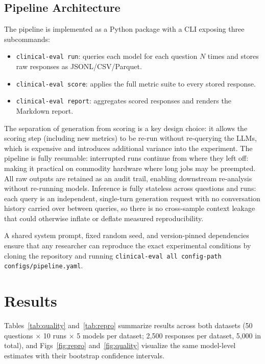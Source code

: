 \documentclass[11pt]{article}
\begin{document}
\subsection{Pipeline Architecture}

The pipeline is implemented as a Python package with a CLI exposing
three subcommands:

\begin{itemize}
  \item \texttt{clinical-eval run}: queries each model for each
        question $N$ times and stores raw responses as
        JSONL/CSV/Parquet.
  \item \texttt{clinical-eval score}: applies the full metric
        suite to every stored response.
  \item \texttt{clinical-eval report}: aggregates scored
        responses and renders the Markdown report.
\end{itemize}

The separation of generation from scoring is a key design choice:
it allows the scoring step (including new metrics) to be re-run
without re-querying the LLMs, which is expensive and introduces
additional variance into the experiment.
The pipeline is fully resumable: interrupted runs continue from
where they left off: making it practical on commodity hardware
where long jobs may be preempted.
All raw outputs are retained as an audit trail, enabling downstream
re-analysis without re-running models.
Inference is fully stateless across questions and runs: each query is
an independent, single-turn generation request with no conversation
history carried over between queries, so there is no cross-sample
context leakage that could otherwise inflate or deflate measured
reproducibility.

A shared system prompt, fixed random seed, and version-pinned
dependencies ensure that any researcher can reproduce the exact
experimental conditions by cloning the repository and running
\texttt{clinical-eval all \-\-config-path configs/pipeline.yaml}.

\section{Results}
\label{sec:results}

Tables~\ref{tab:quality} and~\ref{tab:repro} summarize results across
both datasets (50 questions $\times$ 10 runs $\times$ 5 models per
dataset; 2{,}500 responses per dataset, 5{,}000 in total), and
Figs~\ref{fig:repro} and~\ref{fig:quality} visualize the same
model-level estimates with their bootstrap confidence intervals.
\end{document}
